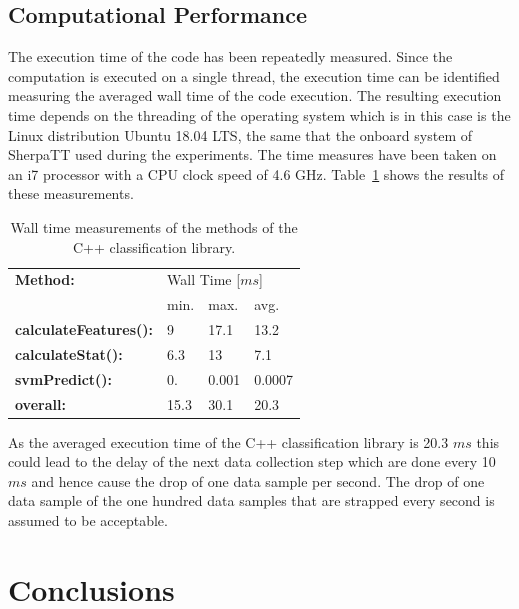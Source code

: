 \documentclass{article}
\begin{document}
\subsection{Computational Performance}

The execution time of the code has been repeatedly measured. 
Since the computation is executed on a single thread, the execution time can be identified measuring the averaged wall time of the code execution. 
The resulting execution time depends on the threading of the operating system which is in this case is the Linux distribution Ubuntu 18.04 LTS, the same that the onboard system of SherpaTT used during the experiments. 
The time measures have been taken on an i7 processor with a CPU clock speed of 4.6 GHz. 
Table~\ref{table:compmeasurments} shows the results of these measurements. 

\begin{table}[htb!]
   \centering
    \begin{tabularx}{\columnwidth}{X|XXX}
        \textbf{Method:} & \multicolumn{3}{X}{Wall Time [$ms$]} \\
        &min.&max.&avg.\\
        \hline
        \hline
        \textbf{calculateFeatures():} & 9&  17.1& 13.2 \\
        \textbf{calculateStat():}     & 6.3 & 13 & 7.1 \\
        \textbf{svmPredict():}        &  0. &  0.001 & 0.0007  \\
        \hline
        \textbf{overall:}             & 15.3 & 30.1 &20.3  \\
    \end{tabularx}	
    \caption{Wall time measurements of the methods of the C++ classification library.}
    \label{table:compmeasurments}
\end{table}

As the averaged execution time of the C++ classification library is 20.3 $ms$ this could lead to the delay of the next data collection step which are done every 10 $ms$ and hence cause the drop of one data sample per second. 
The drop of one data sample of the one hundred data samples that are strapped every second is assumed to be acceptable.


\section{Conclusions}
\end{document}
